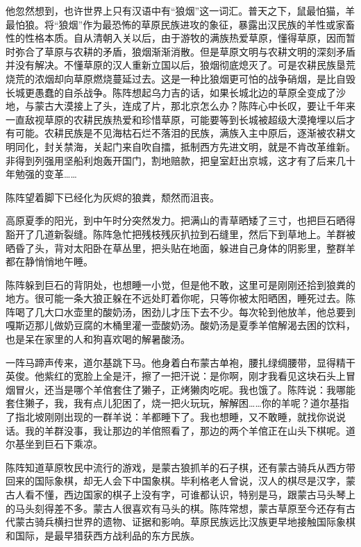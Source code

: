 \par 他忽然想到，也许世界上只有汉语中有“狼烟”这一词汇。普天之下，鼠最怕猫，羊最怕狼。将“狼烟”作为最恐怖的草原民族进攻的象征，暴露出汉民族的羊性或家畜性的性格本质。自从清朝入关以后，由于游牧的满族热爱草原，懂得草原，因而暂时弥合了草原与农耕的矛盾，狼烟渐渐消散。但是草原文明与农耕文明的深刻矛盾并没有解决。不懂草原的汉人重新立国以后，狼烟彻底熄灭了。可是农耕民族垦荒烧荒的浓烟却向草原燃烧蔓延过去。这是一种比狼烟更可怕的战争硝烟，是比自毁长城更愚蠢的自杀战争。陈阵想起乌力吉的话，如果长城北边的草原全变成了沙地，与蒙古大漠接上了头，连成了片，那北京怎么办？陈阵心中长叹，要让千年来一直敌视草原的农耕民族热爱和珍惜草原，可能要等到长城被超级大漠掩埋以后才有可能。农耕民族是不见海枯石烂不落泪的民族，满族入主中原后，逐渐被农耕文明同化，封关禁海，关起门来自吹自擂，抵制西方先进文明，就是不肯改革维新。非得到列强用坚船利炮轰开国门，割地赔款，把皇室赶出京城，这才有了后来几十年勉强的变革……
\par 陈阵望着脚下已经化为灰烬的狼粪，颓然而沮丧。
\par 
\par 高原夏季的阳光，到中午时分突然发力。把满山的青草晒矮了三寸，也把巨石晒得豁开了几道新裂缝。陈阵急忙把残枝残灰扒拉到石缝里，然后下到草地上。羊群被晒昏了头，背对太阳卧在草丛里，把头贴在地面，躲进自己身体的阴影里，整群羊都在静悄悄地午睡。
\par 陈阵躲到巨石的背阴处，也想睡一小觉，但是他不敢，这里可是刚刚还拾到狼粪的地方。很可能一条大狼正躲在不远处盯着你呢，只等你被太阳晒困，睡死过去。陈阵喝了几大口水壶里的酸奶汤，困劲儿才压下去不少。每次轮到他放羊，他总要到嘎斯迈那儿做奶豆腐的木桶里灌一壶酸奶汤。酸奶汤是夏季羊倌解渴去困的饮料，也是呆在家里的人和狗喜欢喝的解暑酸汤。
\par 一阵马蹄声传来，道尔基跳下马。他身着白布蒙古单袍，腰扎绿绸腰带，显得精干英俊。他紫红的宽脸上全是汗，擦了一把汗说：是你啊，刚才我看见这块石头上冒烟冒火，还当是哪个羊倌套住了獭子，正烤獭肉吃呢。我也饿了。陈阵说：我哪能套住獭子，我，我有点儿犯困了，烧一把火玩玩，解解困……你的羊呢？道尔基指了指北坡刚刚出现的一群羊说：羊都睡下了。我也想睡，又不敢睡，就找你说说话。我的羊群没事，我让那边的羊倌照看了，那边的两个羊倌正在山头下棋呢。道尔基坐到巨石下乘凉。
\par 陈阵知道草原牧民中流行的游戏，是蒙古狼抓羊的石子棋，还有蒙古骑兵从西方带回来的国际象棋，却无人会下中国象棋。毕利格老人曾说，汉人的棋尽是汉字，蒙古人看不懂，西边国家的棋子上没有字，可谁都认识，特别是马，跟蒙古马头琴上的马头刻得差不多。蒙古人很喜欢有马头的棋。陈阵常想，蒙古草原至今还存有古代蒙古骑兵横扫世界的遗物、证据和影响。草原民族远比汉族更早地接触国际象棋和国际，是最早猎获西方战利品的东方民族。
